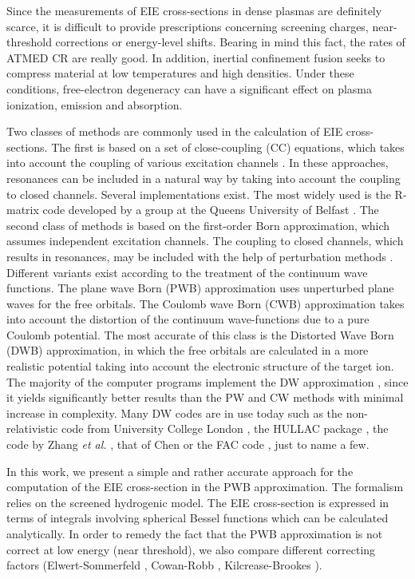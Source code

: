 \documentclass[a4paper,10pt]{article}
\begin{document}
Since the measurements of EIE cross-sections in dense plasmas are definitely scarce, it is difficult to provide prescriptions concerning screening charges, near-threshold corrections or energy-level shifts. Bearing in mind this fact, the rates of ATMED CR are really good. In addition, inertial confinement fusion seeks to compress material at low temperatures and high densities. Under these conditions, free-electron degeneracy can have a significant effect on plasma ionization, emission and absorption. 

Two classes of methods are commonly used in the calculation of EIE cross-sections. The first is based on a set of close-coupling (CC) equations, which takes into account the coupling of various excitation channels \cite{SEATON76}. In these approaches, resonances can be included in a natural way by taking into account the coupling to closed channels. Several implementations exist. The most widely used is the R-matrix code developed by a group at the Queens University of Belfast \cite{BERRINGTON95}. The second class of methods is based on the first-order Born approximation, which assumes independent excitation channels. The coupling to closed channels, which results in resonances, may be included with the help of perturbation methods \cite{EISSNER72}. Different variants exist according to the treatment of the continuum wave functions. The plane wave Born (PWB) approximation uses unperturbed plane waves for the free orbitals. The Coulomb wave Born (CWB) approximation \cite{SEATON62} takes into account the distortion of the continuum wave-functions due to a pure Coulomb potential. The most accurate of this class is the Distorted Wave  Born (DWB) approximation, in which the free orbitals are calculated in a more realistic potential taking into account the electronic structure of the target ion. The majority of the computer programs implement the DW approximation \cite{PAIN19b} , since it yields significantly better results than the PW and CW methods with minimal increase in complexity. Many DW codes are in use today such as the non-relativistic code from University College London \cite{EISSNER98}, the HULLAC package \cite{BAR88}, the code by Zhang \textit{et al.} \cite{ZHANG89}, that of Chen \cite{CHEN96} or the FAC code \cite{GU08}, just to name a few. 

In this work, we present a simple and rather accurate approach for the computation of the EIE cross-section in the PWB approximation. The formalism relies on the screened hydrogenic model. The EIE cross-section is expressed in terms of integrals involving spherical Bessel functions which can be calculated analytically. In order to remedy the fact that the PWB approximation is not correct at low energy (near threshold), we also compare different correcting factors (Elwert-Sommerfeld \cite{SOMMERFELD53,BIEDENHARN56,BETHE57}, Cowan-Robb \cite{COWAN81}, Kilcrease-Brookes \cite{KILCREASE13}).
\end{document}
